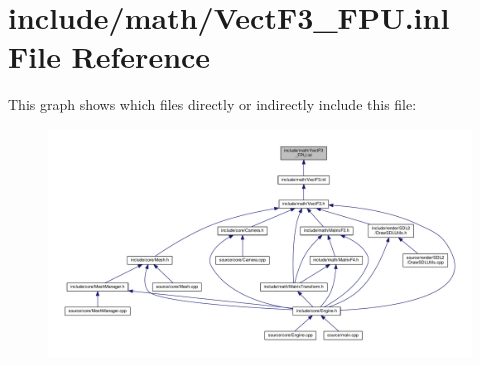 \hypertarget{VectF3__FPU_8inl}{\section{include/math/\-Vect\-F3\-\_\-\-F\-P\-U.inl File Reference}
\label{VectF3__FPU_8inl}
}
This graph shows which files directly or indirectly include this file\-:
\nopagebreak
\begin{figure}[H]
\begin{center}
\leavevmode
\includegraphics[width=350pt]{VectF3__FPU_8inl__dep__incl}
\end{center}
\end{figure}
